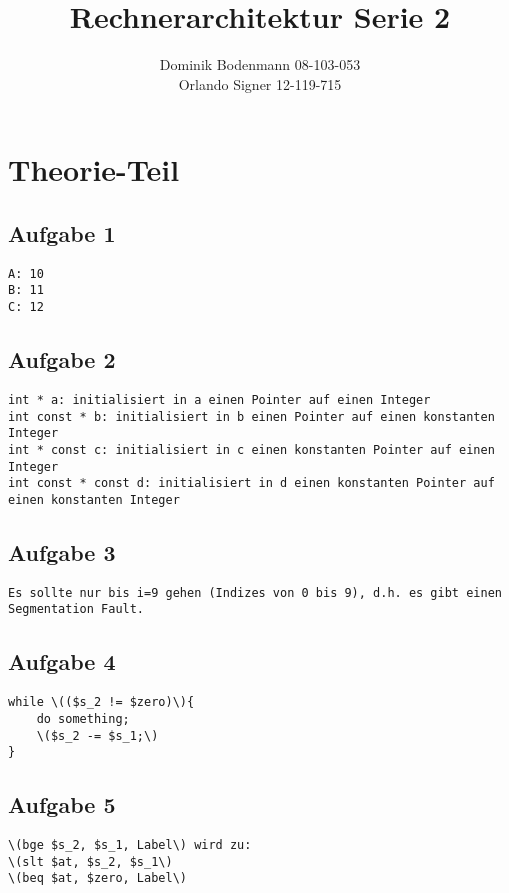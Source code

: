 \documentclass[a4paper,abstracton]{scrartcl}
\title{Rechnerarchitektur Serie 2}
\author{Dominik Bodenmann 08-103-053\\
	Orlando Signer 12-119-715\\}
\begin{document}
\maketitle

\section{Theorie-Teil}
\subsection{Aufgabe 1}
\begin{lstlisting}[caption=Ausgabe]
A: 10
B: 11
C: 12
\end{lstlisting}

\subsection{Aufgabe 2}
\begin{lstlisting}[caption=Eigenschaften]
int * a: initialisiert in a einen Pointer auf einen Integer
int const * b: initialisiert in b einen Pointer auf einen konstanten Integer
int * const c: initialisiert in c einen konstanten Pointer auf einen Integer
int const * const d: initialisiert in d einen konstanten Pointer auf einen konstanten Integer
\end{lstlisting}

\subsection{Aufgabe 3}
\begin{lstlisting}[caption=Problem]
Es sollte nur bis i=9 gehen (Indizes von 0 bis 9), d.h. es gibt einen Segmentation Fault.
\end {lstlisting}

\subsection{Aufgabe 4}
\begin{lstlisting}[caption=C-Code]
while \(($s_2 != $zero)\){
	do something;
	\($s_2 -= $s_1;\)
}
\end{lstlisting}

\subsection{Aufgabe 5}
\begin{lstlisting}[caption=Erweiterung]
\(bge $s_2, $s_1, Label\) wird zu:
\(slt $at, $s_2, $s_1\)
\(beq $at, $zero, Label\)
\end{lstlisting}
\end{document}
